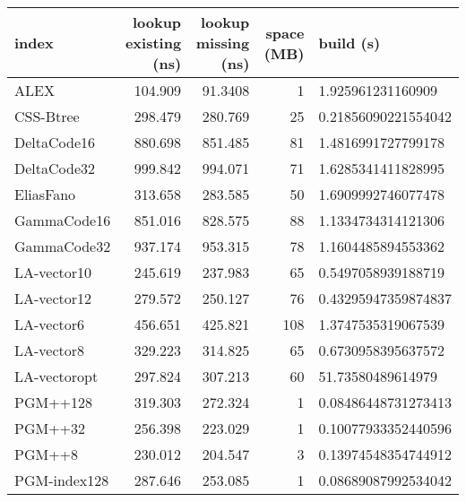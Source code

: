 \begin{tabular}{lrrrl}
\hline
 index             &   lookup existing (ns) &   lookup missing (ns) &   space (MB) & build (s)             \\
\hline
 ALEX              &               104.909  &               91.3408 &            1 & 1.925961231160909     \\
 CSS-Btree         &               298.479  &              280.769  &           25 & 0.21856090221554042   \\
 DeltaCode16       &               880.698  &              851.485  &           81 & 1.4816991727799178    \\
 DeltaCode32       &               999.842  &              994.071  &           71 & 1.6285341411828995    \\
 EliasFano         &               313.658  &              283.585  &           50 & 1.6909992746077478    \\
 GammaCode16       &               851.016  &              828.575  &           88 & 1.1334734314121306    \\
 GammaCode32       &               937.174  &              953.315  &           78 & 1.1604485894553362    \\
 LA-vector10       &               245.619  &              237.983  &           65 & 0.5497058939188719    \\
 LA-vector12       &               279.572  &              250.127  &           76 & 0.43295947359874837   \\
 LA-vector6        &               456.651  &              425.821  &          108 & 1.3747535319067539    \\
 LA-vector8        &               329.223  &              314.825  &           65 & 0.6730958395637572    \\
 LA-vectoropt      &               297.824  &              307.213  &           60 & 51.73580489614979     \\
 PGM++128          &               319.303  &              272.324  &            1 & 0.08486448731273413   \\
 PGM++32           &               256.398  &              223.029  &            1 & 0.10077933352440596   \\
 PGM++8            &               230.012  &              204.547  &            3 & 0.13974548354744912   \\
 PGM-index128      &               287.646  &              253.085  &            1 & 0.08689087992534042   \\

\end{tabular}
